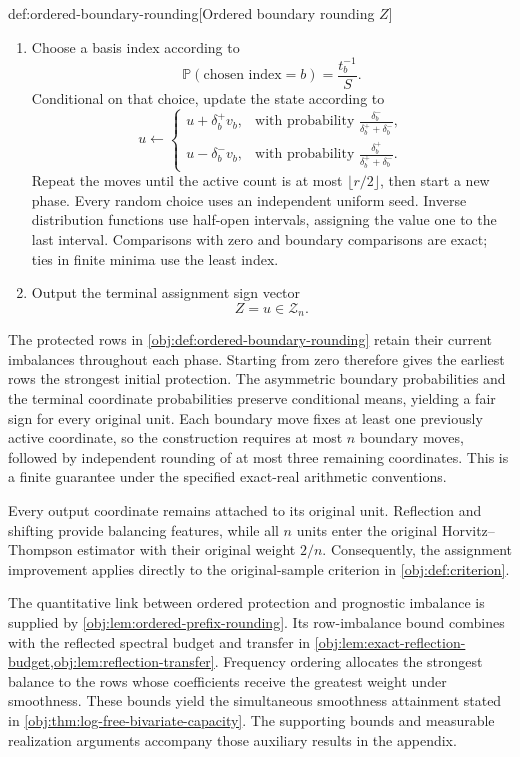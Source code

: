 \begin{algorithmv}{def:ordered-boundary-rounding}[Ordered boundary rounding $Z$]
\begin{enumerate}
\item Choose a basis index according to
\[
\mathbb P(\text{chosen index}=b)=\frac{t_b^{-1}}{S}.
\]
Conditional on that choice, update the state according to
\[
u\leftarrow
\begin{cases}
u+\delta_b^+v_b,
&\text{with probability }\displaystyle\frac{\delta_b^-}{\delta_b^++\delta_b^-},\\[6pt]
u-\delta_b^-v_b,
&\text{with probability }\displaystyle\frac{\delta_b^+}{\delta_b^++\delta_b^-}.
\end{cases}
\]
Repeat the moves until the active count is at most \(\lfloor r/2\rfloor\), then start a new phase. Every random choice uses an independent uniform seed. Inverse distribution functions use half-open intervals, assigning the value one to the last interval. Comparisons with zero and boundary comparisons are exact; ties in finite minima use the least index.

\item Output the terminal assignment sign vector
\[
Z=u\in\mathcal Z_n.
\]
\end{enumerate}
\end{algorithmv}

The protected rows in \cref{obj:def:ordered-boundary-rounding} retain their current imbalances throughout each phase. Starting from zero therefore gives the earliest rows the strongest initial protection. The asymmetric boundary probabilities and the terminal coordinate probabilities preserve conditional means, yielding a fair sign for every original unit. Each boundary move fixes at least one previously active coordinate, so the construction requires at most \(n\) boundary moves, followed by independent rounding of at most three remaining coordinates. This is a finite guarantee under the specified exact-real arithmetic conventions.

Every output coordinate remains attached to its original unit. Reflection and shifting provide balancing features, while all \(n\) units enter the original Horvitz--Thompson estimator with their original weight \(2/n\). Consequently, the assignment improvement applies directly to the original-sample criterion in \cref{obj:def:criterion}.

The quantitative link between ordered protection and prognostic imbalance is supplied by \cref{obj:lem:ordered-prefix-rounding}. Its row-imbalance bound combines with the reflected spectral budget and transfer in \cref{obj:lem:exact-reflection-budget,obj:lem:reflection-transfer}. Frequency ordering allocates the strongest balance to the rows whose coefficients receive the greatest weight under smoothness. These bounds yield the simultaneous smoothness attainment stated in \cref{obj:thm:log-free-bivariate-capacity}. The supporting bounds and measurable realization arguments accompany those auxiliary results in the appendix.
